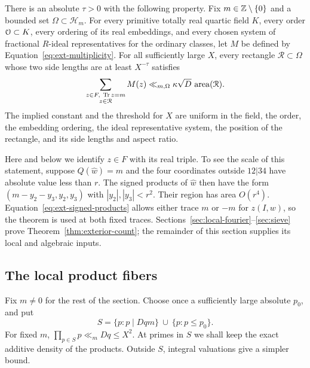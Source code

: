 \begin{theorem}
\label{thm:exterior-count}
There is an absolute \(\tau>0\) with the following property.  Fix
\(m\in\mathbb Z\setminus\{0\}\) and a bounded set
\(\Omega\subset\mathcal H_m\).  For every primitive totally real quartic
field \(K\), every order \(\mathcal O\subset K\), every ordering of its real
embeddings, and every chosen system of fractional \(R\)-ideal
representatives for the ordinary classes, let \(M\) be defined by
Equation~\eqref{eq:ext-multiplicity}.
For all sufficiently large \(X\), every rectangle
\(\mathcal R\subset\Omega\) whose two side lengths are at least
\(X^{-\tau}\) satisfies
\begin{equation}
 \sum_{\substack{z\in F,\ \operatorname{Tr} z=m\\z\in\mathcal R}}M(z)
 \ll_{m,\Omega}\kappa\sqrt D\,\operatorname{area}(\mathcal R).
 \label{eq:ext-planar-count}
\end{equation}
The implied constant and the threshold for \(X\) are uniform in the
field, the order, the embedding ordering, the ideal representative system,
the position of the rectangle, and its side lengths and aspect ratio.
\end{theorem}

Here and below we identify \(z\in F\) with its real triple.  To see the
scale of this statement, suppose \(Q(\widehat w)=m\) and the four
coordinates outside \(12|34\) have absolute value less than \(r\).
The signed products of \(\widehat w\) then have the form
\((m-y_2-y_3,y_2,y_3)\) with \(|y_2|,|y_3|<r^2\).  Their region has area
\(O(r^4)\).  Equation~\eqref{eq:ext-signed-products} allows either trace
\(m\) or \(-m\) for \(z(I,w)\), so the theorem is used at both fixed
traces.  Sections~\ref{sec:local-fourier}--\ref{sec:sieve} prove
Theorem~\ref{thm:exterior-count}; the remainder of this section supplies
its local and algebraic inputs.

\subsection{The local product fibers}

Fix \(m\ne0\) for the rest of the section.  Choose once a sufficiently
large absolute \(p_0\), and put
\begin{equation}
 S=\{p:p\mid Dqm\}\ \cup\ \{p:p\le p_0\}.
 \label{eq:ext-prime-set}
\end{equation}
For fixed \(m\),
\(\prod_{p\in S}p\ll_m Dq\le X^2\).  At primes in \(S\) we shall keep
the exact additive density of the products.  Outside \(S\), integral
valuations give a simpler bound.

